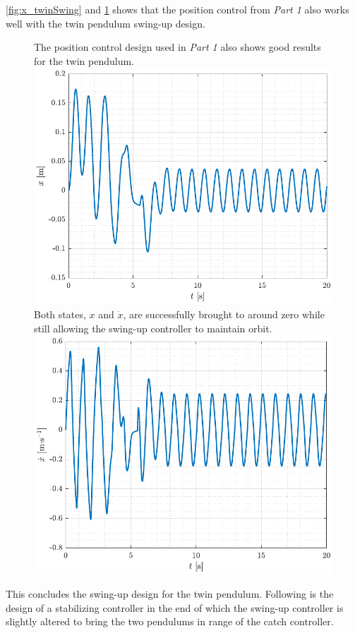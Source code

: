 %
\autoref{fig:x_twinSwing} and \ref{fig:xDot_twinSwing} shows that the position control from \textit{Part 1} also works well with the twin pendulum swing-up design.
\begin{figure}[H]
  \hspace{-10pt}
  \captionbox
  {
    The position control design used in \textit{Part 1} also shows good results for the twin pendulum.
    \label{fig:x_twinSwing}
  }
  {
    \hspace{-1cm}
    \includegraphics[width=.4\textwidth]{figures/x_twinSwing}
  }
  \hspace{20pt}
  \captionbox 
  {
    Both states, $x$ and $\dot{x}$, are successfully brought to around zero while still allowing the swing-up controller to maintain orbit.
    \label{fig:xDot_twinSwing}
  }
  {
    \hspace{-1cm}
    \includegraphics[width=.4\textwidth]{figures/xDot_twinSwing}
  }  
\end{figure}
%
%
%
%
This concludes the swing-up design for the twin pendulum. Following is the design of a stabilizing controller in the end of which the swing-up controller is slightly altered to bring the two pendulums in range of the catch controller.